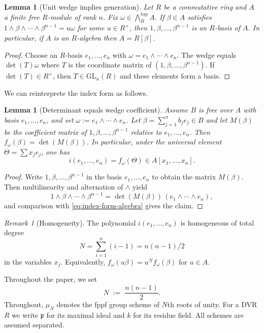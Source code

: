 \documentclass[11pt,letterpaper]{amsart}
\newcommand{\wedgeTop}{\bigwedge\nolimits^{\mathrm{top}}}
\theoremstyle{plain}
\newtheorem{lemma}[theorem]{Lemma}
\theoremstyle{definition}
\theoremstyle{remark}
\newtheorem{remark}[theorem]{Remark}
\theoremstyle{plain}
\begin{document}
\begin{lemma}[Unit wedge implies generation]\label{lem:unitwedge}
Let $R$ be a commutative ring and $A$ a finite free $R$-module of rank $n$.
Fix $\omega\in\wedgeTop_R A$.
If $\beta\in A$ satisfies $1\wedge\beta\wedge\cdots\wedge\beta^{n-1}=u\omega$ for some $u\in R^\times$,
then $1,\beta,\dots,\beta^{n-1}$ is an $R$-basis of $A$. In particular, if $A$ is an $R$-algebra then $A=R[\beta]$.
\end{lemma}

\begin{proof}
Choose an $R$-basis $e_1,\dots,e_n$ with $\omega=e_1\wedge\cdots\wedge e_n$.
The wedge equals $\det(T)\omega$ where $T$ is the coordinate matrix of $(1,\beta,\dots,\beta^{n-1})$.
If $\det(T)\in R^\times$, then $T\in \mathrm{GL}_n(R)$ and these elements form a basis.
\end{proof}

We can reinterprete the index form as follows.

\begin{lemma}[Determinant equals wedge coefficient]\label{lem:det-equals-wedge}
Assume $B$ is free over $A$ with basis $e_1,\dots,e_n$, and set $\omega:=e_1\wedge \cdots \wedge e_n$.
Let $\beta=\sum_{j=1}^n b_j e_j\in B$ and let $M(\beta)$ be the coefficient matrix of
$1,\beta,\dots,\beta^{n-1}$ relative to $e_1,\dots,e_n$.
Then $f_\omega(\beta)=\det(M(\beta))$.
In particular, under the universal element $\Theta=\sum x_j e_j$, one has
\[
i(e_1,\dots,e_n)= f_\omega(\Theta)\in A[x_1,\dots,x_n].
\]
\end{lemma}

\begin{proof}
Write $1,\beta,\dots,\beta^{n-1}$ in the basis $e_1,\dots,e_n$ to obtain the matrix $M(\beta)$.
Then multilinearity and alternation of $\wedge$ yield
\[
1\wedge\beta\wedge\cdots\wedge\beta^{n-1}
=\det(M(\beta))\,(e_1\wedge\cdots\wedge e_n),
\]
and comparison with \eqref{eq:index-form-algebra} gives the claim.
\end{proof}

\begin{remark}[Homogeneity]\label{rem:homog}
The polynomial $i(e_1,\dots,e_n)$ is homogeneous of total degree
\[
N=\sum_{i=1}^n(i-1)=n(n-1)/2
\]
in the variables $x_j$.
Equivalently, $f_\omega(u\beta)=u^N f_\omega(\beta)$ for $u\in A$.
\end{remark}

Throughout the paper, we set
\[
N \;:=\; \frac{n(n-1)}2.
\]
Throughout, $\mu_N$ denotes the fppf group scheme of $N$th roots of unity.
For a DVR $R$ we write $\mathfrak p$ for its maximal ideal and $k$ for its residue field. All schemes are assumed separated.
\end{document}
